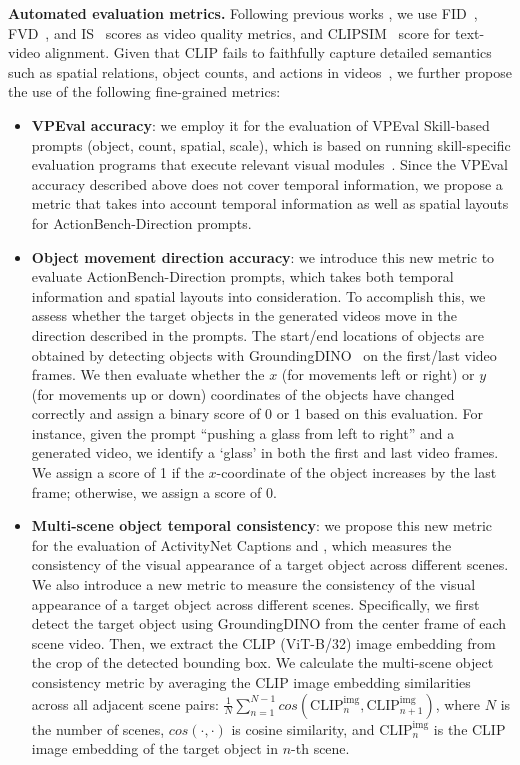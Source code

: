 \documentclass{article}
\begin{document}
\vspace{5pt}
\noindent\textbf{Automated evaluation metrics.} Following previous works \citep{hong2022cogvideo, wu2022nuwa1, wang2023modelscope},
we use {FID}~\citep{heusel2017gans}, {FVD}~\citep{unterthiner2019fvd}, and {IS}~\citep{salimans2016improved} scores as video quality metrics, and {CLIPSIM}~\citep{wu2021godiva} score
for text-video alignment.
Given that CLIP fails to faithfully capture detailed semantics such as spatial relations, object counts, and actions
in videos~\citep{otani2023verifiable,Cho2023DallEval,cho2023visual,hu2023tifa},
we further propose the use of the following fine-grained metrics:
\begin{itemize}[leftmargin=1em]
    \item \textbf{VPEval accuracy}: we employ it for the evaluation of VPEval Skill-based prompts (object, count, spatial, scale), which is based on running skill-specific evaluation programs that execute relevant visual modules~\citep{cho2023visual}.
    Since the VPEval accuracy described above does not cover temporal information, we propose a metric that takes into account temporal information as well as spatial layouts for ActionBench-Direction prompts.
    \item \textbf{Object movement direction accuracy}: we introduce this new metric to evaluate ActionBench-Direction prompts, which takes both temporal information and spatial layouts into consideration. 
    To accomplish this, we assess whether the target objects in the generated videos move in the direction described in the prompts.
The start/end locations of objects are obtained by detecting objects with GroundingDINO~\citep{liu2023grounding} on the first/last video frames.
We then evaluate whether the $x$ (for movements left or right) or $y$ (for movements up or down) coordinates of the objects have changed correctly and assign a binary score of 0 or 1 based on this evaluation.
For instance, given the prompt ``pushing a glass from left to right'' and a generated video, we identify a `glass' in both the first and last video frames.
We assign a score of 1 if the $x$-coordinate of the object increases by the last frame; otherwise, we assign a score of 0.
    \item \textbf{Multi-scene object temporal consistency}: we propose this new metric for the evaluation of ActivityNet Captions and \corefdata{}, which measures the consistency of the visual appearance of a target object across different scenes.
    We also introduce a new metric to measure the consistency of the visual appearance of a target object across different scenes. 
Specifically, we first detect the target object using GroundingDINO from the center frame of each scene video.
Then, we extract the CLIP (ViT-B/32) image embedding from the crop of the detected bounding box.
We calculate the multi-scene object consistency metric by averaging the CLIP image embedding similarities across all adjacent scene pairs:
$\frac{1}{N} \sum_{n=1}^{N-1} cos(\text{CLIP}^{\text{img}}_{n}, \text{CLIP}^{\text{img}}_{n+1})$,
where $N$ is the number of scenes,
$cos(\cdot,\cdot)$ is cosine similarity,
and $\text{CLIP}^{\text{img}}_{n}$ is the CLIP image embedding of the target object in $n$-th scene.


\end{itemize}
\end{document}
